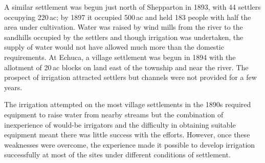 A similar settlement was begun just north of Shepparton in 1893, with
44 settlers occupying 220\,ac; by 1897 it occupied 500\,ac and held
183 people with half the area under cultivation.  Water was raised by
wind mills from the river to the sandhills occupied by the settlers
and though irrigation was undertaken, the supply of water would not
have allowed much more than the domestic requirements.  At Echuca, a
village settlement was begun in 1894 with the allotment of 20\,ac
blocks on land east of the township and near the river.  The prospect
of irrigation attracted settlers but channels were not provided for a
few years.

\closure
The irrigation attempted on the most village settlements in the 1890s
required equipment to raise water from nearby streams but the
combination of inexperience of would-be irrigators and the difficulty
in obtaining suitable equipment meant there was little success with
the efforts.  However, once these weaknesses were overcome, the
experience made it possible to develop irrigation successfully at most
of the sites under different conditions of settlement.


